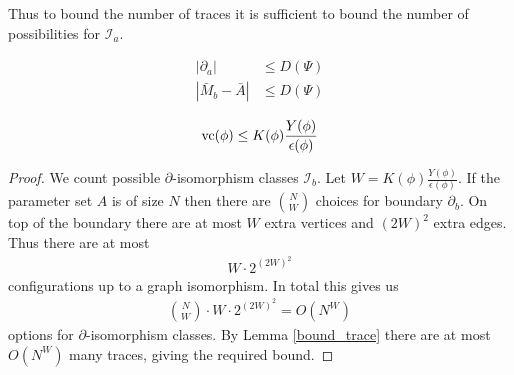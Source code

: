 \documentclass{amsart}
\newcommand{\II}{\mathscr I}
\begin{document}
Thus to bound the number of traces it is sufficient to bound the number of possibilities for $\II_a$.

\begin{Theorem} \label{main_bound}
  \begin{align*}
    |\partial_a| &\leq D(\Psi) \\ 
    |\bar M_b - \bar A| &\leq D(\Psi)
  \end{align*}
\end{Theorem}

\begin{Corollary}
  \begin{align*}
    \operatorname{vc}(\phi) \leq K(\phi) \frac{Y(\phi)}{\epsilon(\phi)}
  \end{align*}
\end{Corollary}

\begin{proof}
  We count possible $\partial$-isomorphism classes $\II_b$.
  Let $W = K(\phi) \frac{Y(\phi)}{\epsilon(\phi)}$.
  If the parameter set $A$ is of size $N$ then there are $N \choose W$ choices for boundary $\partial_b$.
  On top of the boundary there are at most $W$ extra vertices and $(2W)^2$ extra edges.
  Thus there are at most
  \begin{align*}
    W \cdot 2^{(2W)^2}
  \end{align*}
  configurations up to a graph isomorphism.
  In total this gives us 
  \begin{align*}
    {N \choose W} \cdot W \cdot 2^{(2W)^2} = O(N^W)
  \end{align*}
  options for $\partial$-isomorphism classes.
  By Lemma \ref{bound_trace} there are at most $O(N^W)$ many traces, giving the required bound.
\end{proof}
\end{document}
